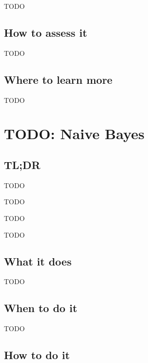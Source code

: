 \documentclass[
]{book}
\providecommand{\tightlist}{%
  \setlength{\itemsep}{0pt}\setlength{\parskip}{0pt}}
\begin{document}
TODO

\hypertarget{how-to-assess-it-5}{%
\section{How to assess it}\label{how-to-assess-it-5}}

TODO

\hypertarget{where-to-learn-more-5}{%
\section{Where to learn more}\label{where-to-learn-more-5}}

TODO

\hypertarget{naive-bayes}{%
\chapter{TODO: Naive Bayes}\label{naive-bayes}}

\hypertarget{tldr-6}{%
\section{TL;DR}\label{tldr-6}}

\begin{description}
\tightlist
\item[What it does]
TODO
\item[When to do it]
TODO
\item[How to do it]
TODO
\item[How to assess it]
TODO
\end{description}

\hypertarget{what-it-does-6}{%
\section{What it does}\label{what-it-does-6}}

TODO

\hypertarget{when-to-do-it-6}{%
\section{When to do it}\label{when-to-do-it-6}}

TODO

\hypertarget{how-to-do-it-6}{%
\section{How to do it}\label{how-to-do-it-6}}
\end{document}
